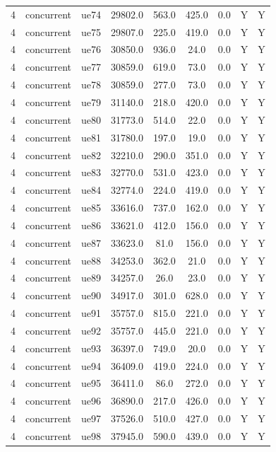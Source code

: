 \begin{table}[ht]
\begin{tabular}{|c|c|c|c|c|c|c|c|c|}
4 & concurrent & ue74 & 29802.0 & 563.0 & 425.0 & 0.0 & Y & Y \\
4 & concurrent & ue75 & 29807.0 & 225.0 & 419.0 & 0.0 & Y & Y \\
4 & concurrent & ue76 & 30850.0 & 936.0 & 24.0 & 0.0 & Y & Y \\
4 & concurrent & ue77 & 30859.0 & 619.0 & 73.0 & 0.0 & Y & Y \\
4 & concurrent & ue78 & 30859.0 & 277.0 & 73.0 & 0.0 & Y & Y \\
4 & concurrent & ue79 & 31140.0 & 218.0 & 420.0 & 0.0 & Y & Y \\
4 & concurrent & ue80 & 31773.0 & 514.0 & 22.0 & 0.0 & Y & Y \\
4 & concurrent & ue81 & 31780.0 & 197.0 & 19.0 & 0.0 & Y & Y \\
4 & concurrent & ue82 & 32210.0 & 290.0 & 351.0 & 0.0 & Y & Y \\
4 & concurrent & ue83 & 32770.0 & 531.0 & 423.0 & 0.0 & Y & Y \\
4 & concurrent & ue84 & 32774.0 & 224.0 & 419.0 & 0.0 & Y & Y \\
4 & concurrent & ue85 & 33616.0 & 737.0 & 162.0 & 0.0 & Y & Y \\
4 & concurrent & ue86 & 33621.0 & 412.0 & 156.0 & 0.0 & Y & Y \\
4 & concurrent & ue87 & 33623.0 & 81.0 & 156.0 & 0.0 & Y & Y \\
4 & concurrent & ue88 & 34253.0 & 362.0 & 21.0 & 0.0 & Y & Y \\
4 & concurrent & ue89 & 34257.0 & 26.0 & 23.0 & 0.0 & Y & Y \\
4 & concurrent & ue90 & 34917.0 & 301.0 & 628.0 & 0.0 & Y & Y \\
4 & concurrent & ue91 & 35757.0 & 815.0 & 221.0 & 0.0 & Y & Y \\
4 & concurrent & ue92 & 35757.0 & 445.0 & 221.0 & 0.0 & Y & Y \\
4 & concurrent & ue93 & 36397.0 & 749.0 & 20.0 & 0.0 & Y & Y \\
4 & concurrent & ue94 & 36409.0 & 419.0 & 224.0 & 0.0 & Y & Y \\
4 & concurrent & ue95 & 36411.0 & 86.0 & 272.0 & 0.0 & Y & Y \\
4 & concurrent & ue96 & 36890.0 & 217.0 & 426.0 & 0.0 & Y & Y \\
4 & concurrent & ue97 & 37526.0 & 510.0 & 427.0 & 0.0 & Y & Y \\
4 & concurrent & ue98 & 37945.0 & 590.0 & 439.0 & 0.0 & Y & Y \\

\end{tabular}
\end{table}
